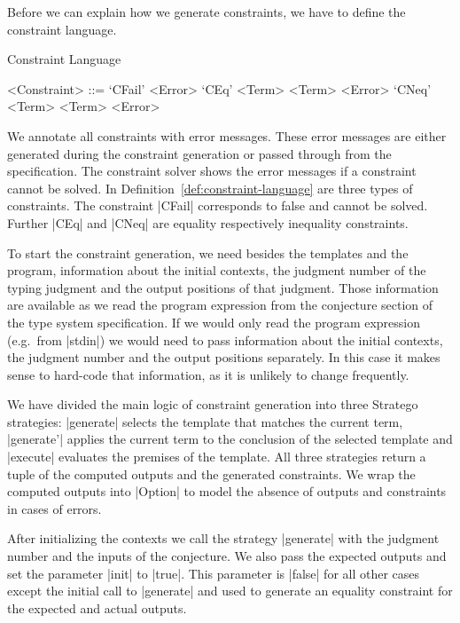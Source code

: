 Before we can explain how we generate constraints, we have to define
the constraint language.

\begin{definition}{Constraint Language}
  \begin{grammar}
    <Constraint> ::= `CFail' <Error>
    \alt `CEq' <Term> <Term> <Error>
    \alt `CNeq' <Term> <Term> <Error>
  \end{grammar}
\label{def:constraint-language}
\end{definition}

We annotate all constraints with error messages. These error messages
are either generated during the constraint generation or passed
through from the specification. The constraint solver shows the error
messages if a constraint cannot be solved. In
Definition~\ref{def:constraint-language} are three types of
constraints. The constraint \code|CFail| corresponds to false and
cannot be solved. Further \code|CEq| and \code|CNeq| are equality
respectively inequality constraints.

To start the constraint generation, we need besides the templates and
the program, information about the initial contexts, the judgment
number of the typing judgment and the output positions of that
judgment. Those information are available as we read the program
expression from the conjecture section of the type system
specification. If we would only read the program expression (e.g.\
from \code|stdin|) we would need to pass information about the initial
contexts, the judgment number and the output positions separately. In
this case it makes sense to hard-code that information, as it is
unlikely to change frequently.

We have divided the main logic of constraint generation into three
Stratego strategies: \code|generate| selects the template that matches
the current term, \code|generate'| applies the current term to the
conclusion of the selected template and \code|execute| evaluates the
premises of the template. All three strategies return a tuple of the
computed outputs and the generated constraints. We wrap the computed
outputs into \code|Option| to model the absence of outputs and
constraints in cases of errors.

After initializing the contexts we call the strategy \code|generate|
with the judgment number and the inputs of the conjecture. We also
pass the expected outputs and set the parameter \code|init| to
\code|true|. This parameter is \code|false| for all other cases except
the initial call to \code|generate| and used to generate an equality
constraint for the expected and actual outputs.

